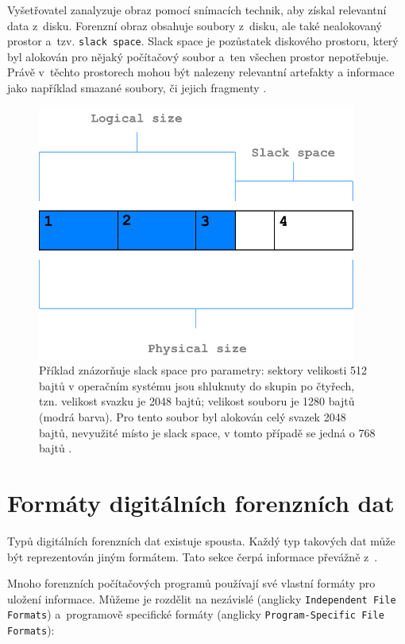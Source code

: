 Vyšetřovatel zanalyzuje obraz pomocí snímacích technik, aby získal relevantní data z~disku. Forenzní obraz obsahuje soubory z~disku, ale také nealokovaný prostor a~tzv. \texttt{slack space}. Slack space je pozůstatek diskového prostoru, který byl alokován pro nějaký počítačový soubor a~ten všechen prostor nepotřebuje. Právě v~těchto prostorech mohou být nalezeny relevantní artefakty a informace jako například smazané soubory, či jejich fragmenty \cite{forensicImages}.

\begin{figure}[!h]
  \centering
  \includegraphics[width=10.5cm]{template-fig/SlackSpace.pdf}
  \caption{Příklad znázorňuje slack space pro parametry: sektory velikosti 512 bajtů v operačním systému jsou shluknuty do skupin po čtyřech, tzn. velikost svazku je 2048 bajtů; velikost souboru je 1280 bajtů (modrá barva). Pro tento soubor byl alokován celý svazek 2048 bajtů, nevyužité místo je slack space, v tomto případě se jedná o 768 bajtů \cite{slacSpace}.}
  \label{FIG_SlackSpace}
\end{figure}

\section{Formáty digitálních forenzních dat}
Typů digitálních forenzních dat existuje spousta. Každý typ takových dat může být reprezentován jiným formátem. Tato sekce čerpá informace převážně z~\cite{forensicswikiForensicFF}.

Mnoho forenzních počítačových programů používají své vlastní formáty pro uložení informace. Můžeme je rozdělit na nezávislé (anglicky \texttt{Independent File Formats}) a~programově specifické formáty (anglicky \texttt{Program-Specific File Formats}):

